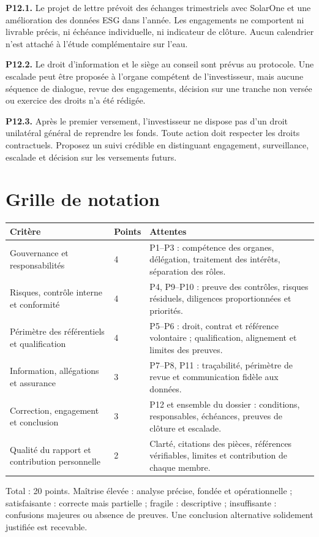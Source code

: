 \documentclass[11pt,a4paper]{article}
\begin{document}
\textbf{P12.1.} Le projet de lettre prévoit des échanges trimestriels avec SolarOne et une amélioration des données ESG dans l’année. Les engagements ne comportent ni livrable précis, ni échéance individuelle, ni indicateur de clôture. Aucun calendrier n’est attaché à l’étude complémentaire sur l’eau.

\textbf{P12.2.} Le droit d’information et le siège au conseil sont prévus au protocole. Une escalade peut être proposée à l’organe compétent de l’investisseur, mais aucune séquence de dialogue, revue des engagements, décision sur une tranche non versée ou exercice des droits n’a été rédigée.

\textbf{P12.3.} Après le premier versement, l’investisseur ne dispose pas d’un droit unilatéral général de reprendre les fonds. Toute action doit respecter les droits contractuels. Proposez un suivi crédible en distinguant engagement, surveillance, escalade et décision sur les versements futurs.

\clearpage\section{Grille de notation}
\begin{longtable}{p{}p{}p{}}\toprule Critère & Points & Attentes\\\midrule\endhead
Gouvernance et responsabilités & 4 & P1--P3 : compétence des organes, délégation, traitement des intérêts, séparation des rôles.\\[5pt]
Risques, contrôle interne et conformité & 4 & P4, P9--P10 : preuve des contrôles, risques résiduels, diligences proportionnées et priorités.\\[5pt]
Périmètre des référentiels et qualification & 4 & P5--P6 : droit, contrat et référence volontaire ; qualification, alignement et limites des preuves.\\[5pt]
Information, allégations et assurance & 3 & P7--P8, P11 : traçabilité, périmètre de revue et communication fidèle aux données.\\[5pt]
Correction, engagement et conclusion & 3 & P12 et ensemble du dossier : conditions, responsables, échéances, preuves de clôture et escalade.\\[5pt]
Qualité du rapport et contribution personnelle & 2 & Clarté, citations des pièces, références vérifiables, limites et contribution de chaque membre.\\[5pt]
\bottomrule\end{longtable}
Total : 20 points. Maîtrise élevée : analyse précise, fondée et opérationnelle ; satisfaisante : correcte mais partielle ; fragile : descriptive ; insuffisante : confusions majeures ou absence de preuves. Une conclusion alternative solidement justifiée est recevable.
\end{document}
